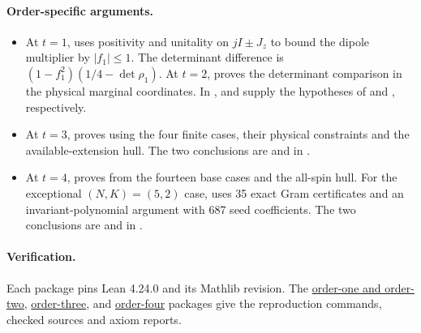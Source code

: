\documentclass[11pt,a4paper]{article}
\begin{document}
\paragraph{Order-specific arguments.}
\begin{itemize}
\item At $t=1$,  uses positivity and unitality
on $jI\pm J_z$ to bound the dipole multiplier by $|f_1|\le1$.
The determinant difference is $(1-f_1^2)(1/4-\det\rho_1)$.
At $t=2$,  proves the determinant
comparison in the physical marginal coordinates. In
,  and
 supply the hypotheses of
 and , respectively.
\item At $t=3$, 
proves  using the four finite cases,
their physical constraints and the available-extension hull.
The two conclusions are  and
 in .
\item At $t=4$, 
proves  from the fourteen base cases
and the all-spin hull. For the exceptional $(N,K)=(5,2)$ case,
 uses 35 exact Gram certificates
and an invariant-polynomial argument with 687 seed coefficients.
The two conclusions are  and
 in .
\end{itemize}

\paragraph{Verification.}
Each package pins Lean 4.24.0 and its Mathlib revision. The
\href{https://github.com/aenictusGitHub/mixed-spin-anticoherence/tree/main/su2-low-order-monotonicity/lean}{order-one and order-two},
\href{https://github.com/aenictusGitHub/mixed-spin-anticoherence/tree/main/su2-low-order-monotonicity/lean-t3}{order-three}, and
\href{https://github.com/aenictusGitHub/mixed-spin-anticoherence/tree/main/su2-low-order-monotonicity/lean-t4}{order-four}
packages give the reproduction commands, checked sources and axiom reports.
\end{document}
